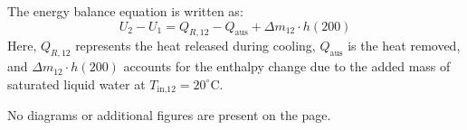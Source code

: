 The energy balance equation is written as:  
\[
U_2 - U_1 = Q_{R,12} - Q_{\text{aus}} + \Delta m_{12} \cdot h(200)
\]  
Here, \( Q_{R,12} \) represents the heat released during cooling, \( Q_{\text{aus}} \) is the heat removed, and \( \Delta m_{12} \cdot h(200) \) accounts for the enthalpy change due to the added mass of saturated liquid water at \( T_{\text{in,12}} = 20^\circ\text{C} \).  

No diagrams or additional figures are present on the page.